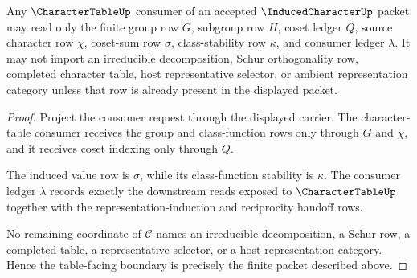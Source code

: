 \begin{theorem}
\label{thm:induced-character-table-consumer-boundary}
Any $\CharacterTableUp$ consumer of an accepted $\InducedCharacterUp$ packet may read only the finite group row $G$, subgroup row $H$, coset ledger $Q$, source character row $\chi$, coset-sum row $\sigma$, class-stability row $\kappa$, and consumer ledger $\lambda$. It may not import an irreducible decomposition, Schur orthogonality row, completed character table, host representative selector, or ambient representation category unless that row is already present in the displayed packet.
\end{theorem}
\begin{proof}
Project the consumer request through the displayed carrier. The character-table consumer receives the group and class-function rows only through $G$ and $\chi$, and it receives coset indexing only through $Q$.

The induced value row is $\sigma$, while its class-function stability is $\kappa$. The consumer ledger $\lambda$ records exactly the downstream reads exposed to $\CharacterTableUp$ together with the representation-induction and reciprocity handoff rows.

No remaining coordinate of $\mathcal{C}$ names an irreducible decomposition, a Schur row, a completed table, a representative selector, or a host representation category. Hence the table-facing boundary is precisely the finite packet described above.
\end{proof}


\begin{closurestatus}{\InducedCharacterUp}
  \theoryclosure{\seedClosure}
  \formalstatus{\unformalizedV}
\end{closurestatus}
